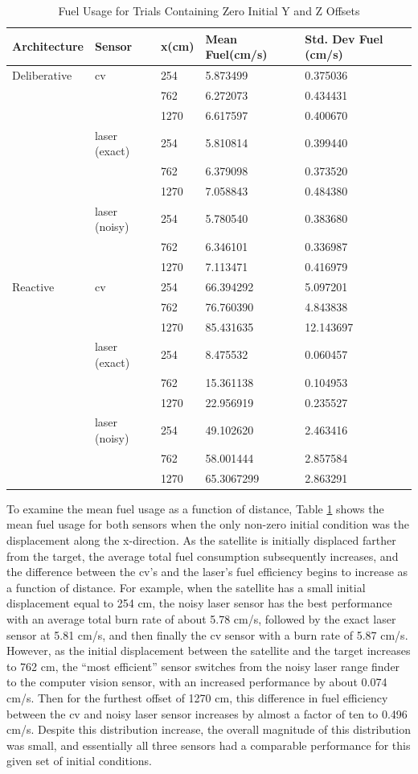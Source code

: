 \documentclass[journal, 10pt]{IEEEtran}
\begin{document}
\begin{table}
\centering
\normalsize
\caption{Fuel Usage for Trials Containing Zero Initial Y and Z Offsets}
\begin{tabular}{lllll}
\toprule
Architecture & Sensor & x(cm) & Mean Fuel(cm/s) & Std. Dev Fuel (cm/s)\\
\midrule
Deliberative & cv & 254  & 5.873499 & 0.375036\\
& & 762 &  6.272073 & 0.434431\\
& & 1270  &  6.617597 &0.400670\\
			& laser (exact) & 254  &    5.810814 &0.399440\\
			& & 762  &    6.379098 &0.373520\\
			& & 1270  & 7.058843 & 0.484380\\
			& laser (noisy) & 254 &    5.780540 &0.383680\\
			& & 762 &    6.346101 &0.336987\\
			& & 1270 & 7.113471 &0.416979\\
\cmidrule(lr) {1-5}
Reactive & cv & 254  &   66.394292 &5.097201\\
& & 762  &   76.760390 & 4.843838\\
& & 1270 & 85.431635 &12.143697\\
& laser (exact) & 254  &   8.475532 & 0.060457\\
& & 762  &  15.361138 &0.104953\\
& & 1270  & 22.956919 & 0.235527\\
& laser (noisy) & 254 &  49.102620 & 2.463416\\
& & 762  &  58.001444 &2.857584\\
& & 1270 & 65.3067299 &2.863291\\
\bottomrule
\end{tabular}
\label{initial}
\end{table}

To examine the mean fuel usage as a function of distance, Table \ref{initial} shows the mean fuel usage for both sensors when the only non-zero initial condition was the displacement along the x-direction. As the satellite is initially displaced farther from the target, the average total fuel consumption subsequently increases, and the difference between the cv's and the laser's fuel efficiency begins to increase as a function of distance. For example, when the satellite has a small initial displacement equal to 254 cm, the noisy laser sensor has the best performance with an average total burn rate of about 5.78 cm/s, followed by the exact laser sensor at 5.81 cm/s, and then finally the cv sensor with a burn rate of 5.87 cm/s. However, as the initial displacement between the satellite and the target increases to 762 cm, the ``most efficient'' sensor switches from the noisy laser range finder to the computer vision sensor, with an increased performance by about 0.074 cm/s. Then for the furthest offset of 1270 cm, this difference in fuel efficiency between the cv and noisy laser sensor increases by almost a factor of ten to 0.496 cm/s. Despite this distribution increase, the overall magnitude of this distribution was small, and essentially all three sensors had a comparable performance for this given set of initial conditions. 
\end{document}
